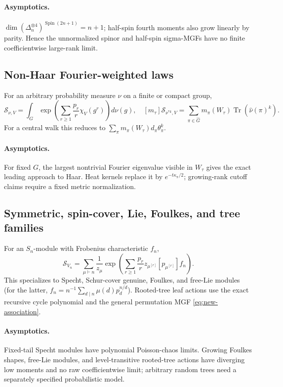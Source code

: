 \documentclass[10pt]{article}
\newcommand{\Tr}{\operatorname{Tr}}
\newcommand{\MGF}{\mathcal S}
\begin{document}
\paragraph{Asymptotics.}
$\dim(\Delta_n^{\otimes4})^{\operatorname{Spin}(2n+1)}=n+1$; half-spin fourth
moments also grow linearly by parity.  Hence the unnormalized spinor and
half-spin sigma-MGFs have no finite coefficientwise large-rank limit.

\subsection{Non-Haar Fourier-weighted laws}
For an arbitrary probability measure $\nu$ on a finite or compact group,
\begin{equation}\label{eq:new-nonhaar}
 \boxed{\MGF_{\nu,V}=\int_G\exp\!\left(\sum_{r\ge1}\frac{p_r}{r}
 \chi_V(g^r)\right)d\nu(g),\quad
 [m_\tau]\MGF_{\nu^{*k},V}=\sum_{\pi\in\widehat G}
 m_\pi(W_\tau)\Tr(\widehat\nu(\pi)^k).}
\end{equation}
For a central walk this reduces to
$\sum_\pi m_\pi(W_\tau)d_\pi\theta_\pi^k$.
\paragraph{Asymptotics.}
For fixed $G$, the largest nontrivial Fourier eigenvalue visible in $W_\tau$
gives the exact leading approach to Haar.  Heat kernels replace it by
$e^{-t\kappa_\pi/2}$; growing-rank cutoff claims require a fixed metric
normalization.

\subsection{Symmetric, spin-cover, Lie, Foulkes, and tree families}
For an $S_n$-module with Frobenius characteristic $f_n$,
\begin{equation}\label{eq:new-frobenius}
 \boxed{\MGF_{V_n}=\sum_{\mu\vdash n}\frac1{z_\mu}
 \exp\!\left(\sum_{r\ge1}\frac{p_r}{r}
 z_{\mu^{[r]}}[p_{\mu^{[r]}}]f_n\right).}
\end{equation}
This specializes to Specht, Schur-cover genuine, Foulkes, and free-Lie modules
(for the latter, $f_n=n^{-1}\sum_{d\mid n}\mu(d)p_d^{n/d}$).  Rooted-tree
leaf actions use the exact recursive cycle polynomial and the general
permutation MGF \eqref{eq:new-association}.
\paragraph{Asymptotics.}
Fixed-tail Specht modules have polynomial Poisson-chaos limits.  Growing
Foulkes shapes, free-Lie modules, and level-transitive rooted-tree actions have
diverging low moments and no raw coefficientwise limit; arbitrary random trees
need a separately specified probabilistic model.
\end{document}
